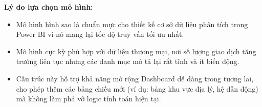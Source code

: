 \noindent\textbf{Lý do lựa chọn mô hình:}
\begin{itemize}[leftmargin=1.0cm]
    \item Mô hình hình sao là chuẩn mực cho thiết kế cơ sở dữ liệu phân tích trong Power BI vì nó mang lại tốc độ truy vấn tối ưu nhất.
    \item Mô hình cực kỳ phù hợp với dữ liệu thương mại, nơi số lượng giao dịch tăng trưởng liên tục nhưng các danh mục mô tả lại rất tĩnh và ít biến động.
    \item Cấu trúc này hỗ trợ khả năng mở rộng Dashboard dễ dàng trong tương lai, cho phép thêm các bảng chiều mới (ví dụ: bảng khu vực địa lý, hệ dẫn động) mà không làm phá vỡ logic tính toán hiện tại.
\end{itemize}


\clearpage